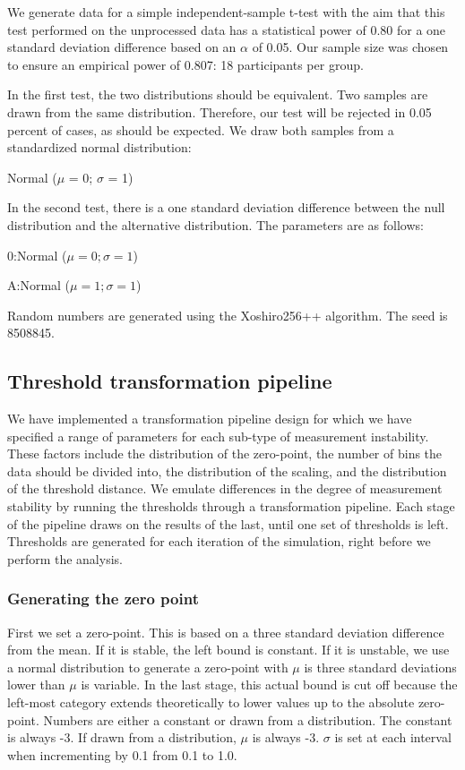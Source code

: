 \documentclass[utf8]{FrontiersinVancouver}
\begin{document}
We generate data for a simple independent-sample t-test with the aim that this test performed on the unprocessed data has a statistical power of 0.80 for a one standard deviation difference based on an $\alpha$ of 0.05. Our sample size was chosen to ensure an empirical power of 0.807: 18 participants per group.  

In the first test, the two distributions should be equivalent. Two samples are drawn from the same distribution. Therefore, our test will be rejected in 0.05 percent of cases, as should be expected. We draw both samples from a standardized normal distribution:

    \centerline{Normal ($\mu$ = 0; $\sigma$ = 1)}

In the second test, there is a one standard deviation difference between the null distribution and the alternative distribution. The parameters are as follows:


    \centerline{0:\@ Normal ($\mu = 0; \sigma = 1$)}
    \centerline{A:\@ Normal ($\mu = 1; \sigma = 1$)}

Random numbers are generated using the Xoshiro256++ algorithm. The seed is 8508845.

\subsection{Threshold transformation pipeline}
We have implemented a transformation pipeline design for which we have specified a range of parameters for each sub-type of measurement instability. These factors include the distribution of the zero-point, the number of bins the data should be divided into, the distribution of the scaling, and the distribution of the threshold distance. We emulate differences in the degree of measurement stability by running the thresholds through a transformation pipeline. Each stage of the pipeline draws on the results of the last, until one set of thresholds is left. Thresholds are generated for each iteration of the simulation, right before we perform the analysis.  

\subsubsection{Generating the zero point}
First we set a zero-point. This is based on a three standard deviation difference from the mean. If it is stable, the left bound is constant. If it is unstable, we use a normal distribution to generate a zero-point with $\mu$ is three standard deviations lower than $\mu$ is variable. In the last stage, this actual bound is cut off because the left-most category extends theoretically to lower values up to the absolute zero-point. Numbers are either a constant or drawn from a distribution. The constant is always -3. If drawn from a distribution, $\mu$ is always -3. $\sigma$ is set at each interval when incrementing by 0.1 from 0.1 to 1.0.
\end{document}
